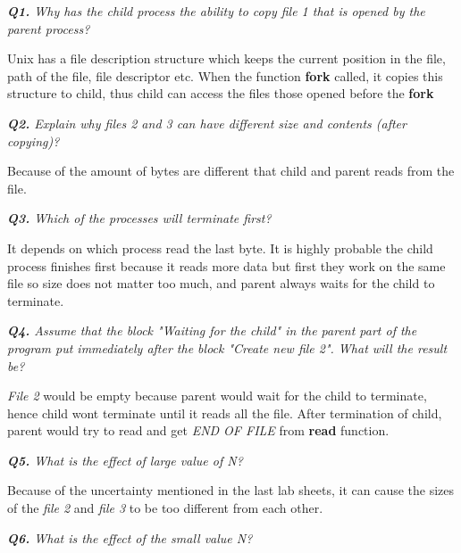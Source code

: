 \documentclass[11pt]{article}
\begin{document}
\vspace{3mm}
\textit{\textbf{Q1.} Why has the child process the ability to copy file 1 that is opened by the parent process?}
\vspace{3mm}

Unix has a file description structure which keeps the current position in the file, path of the file, file descriptor etc. When the function \textbf{fork} called, it copies this structure to child, thus child can access the files those opened before the \textbf{fork}

\vspace{3mm}
\textit{\textbf{Q2.} Explain why files 2 and 3 can have different size and contents (after copying)?}
\vspace{3mm}

Because of the amount of bytes are different that child and parent reads from the file.

\vspace{5mm}
\textit{\textbf{Q3.} Which of the processes will terminate first?}
\vspace{5mm}

It depends on which process read the last byte. It is highly probable the child process finishes first because it reads more data but first they work on the same file so size does not matter too much, and parent always waits for the child to terminate.

\vspace{5mm}
\textit{\textbf{Q4.} Assume that the block "Waiting for the child" in the parent part of the program put immediately after the block "Create new file 2". What will the result be?}
\vspace{5mm}

\textit{File 2} would be empty because parent would wait for the child to terminate, hence child wont terminate until it reads all the file. After termination of child, parent would try to read and get \textit{END OF FILE} from \textbf{read} function.

\vspace{5mm}
\textit{\textbf{Q5.} What is the effect of large value of N?}
\vspace{5mm}

Because of the uncertainty mentioned in the last lab sheets, it can cause the sizes of the \textit{file 2} and \textit{file 3} to be too different from each other.

\vspace{5mm}
\textit{\textbf{Q6.} What is the effect of the small value N?}
\vspace{5mm}
\end{document}
